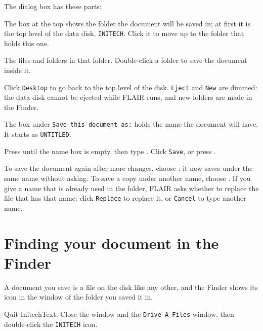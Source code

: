 The dialog box has these parts:

The box at the top shows the folder the document will
be saved in; at first it is the top level of the data disk,
\texttt{INITECH}.  Click it to move up to the folder that holds this one.

The files and folders in that folder.  Double-click a
folder to save the document inside it.

Click \texttt{Desktop} to go back to the top level of the
disk.  \texttt{Eject} and \texttt{New} are dimmed: the data disk cannot be
ejected while FLAIR runs, and new folders are made in the Finder.

The box under \texttt{Save this document as:} holds the name
the document will have.  It starts as \texttt{UNTITLED}.

\begin{TaskSteps}[resume]
\Step Press  until the name box is empty, then type
.
\Step Click \texttt{Save}, or press .
\end{TaskSteps}


To save the document again after more changes, choose : it
now saves under the same name without asking.  To save a copy under
another name, choose .  If you give a name that is
already used in the folder, FLAIR asks whether to replace the file that has
that name: click \texttt{Replace} to replace it, or \texttt{Cancel} to type
another name.


\section{Finding your document in the Finder}
A document you save is a file on the disk like any other, and the Finder
shows its icon in the window of the folder you saved it in.
\begin{TaskSteps}
\Step Quit InitechText.
\Step Close the  window and the \texttt{Drive A Files} window,
then double-click the \texttt{INITECH} icon.
\end{TaskSteps}

